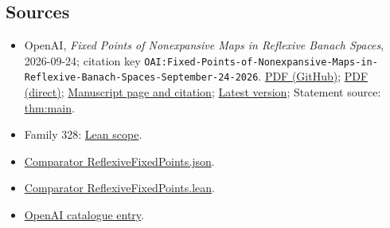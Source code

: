\documentclass[11pt]{article}
\begin{document}
\subsection{Sources}
\begin{itemize}
\item OpenAI, \emph{Fixed Points of Nonexpansive Maps in Reflexive Banach Spaces}, 2026-09-24; citation key \texttt{OAI:Fixed-Points-of-Nonexpansive-Maps-in-Reflexive-Banach-Spaces-September-24-2026}. \href{https://github.com/openai/math/blob/adc7f1241b42e322a6451854ab7e4b4c146bf78a/preprints/Fixed-Points-of-Nonexpansive-Maps-in-Reflexive-Banach-Spaces-September-24-2026/paper.pdf}{PDF (GitHub)}; \href{https://github.com/openai/math/raw/adc7f1241b42e322a6451854ab7e4b4c146bf78a/preprints/Fixed-Points-of-Nonexpansive-Maps-in-Reflexive-Banach-Spaces-September-24-2026/paper.pdf}{PDF (direct)}; \href{https://github.com/openai/math/blob/adc7f1241b42e322a6451854ab7e4b4c146bf78a/preprints/Fixed-Points-of-Nonexpansive-Maps-in-Reflexive-Banach-Spaces-September-24-2026/README.md}{Manuscript page and citation}; \href{https://github.com/openai/math/blob/main/preprints/Fixed-Points-of-Nonexpansive-Maps-in-Reflexive-Banach-Spaces-September-24-2026/paper.pdf}{Latest version}; Statement source: \href{https://github.com/openai/math/blob/adc7f1241b42e322a6451854ab7e4b4c146bf78a/preprints/Fixed-Points-of-Nonexpansive-Maps-in-Reflexive-Banach-Spaces-September-24-2026/build/sections/00-introduction.tex\#L9}{thm:main}.
\item Family 328: \href{https://github.com/openai/math/blob/adc7f1241b42e322a6451854ab7e4b4c146bf78a/lean/docs/328.md}{Lean scope}.
\item \href{https://github.com/openai/math/blob/adc7f1241b42e322a6451854ab7e4b4c146bf78a/lean/ComparatorChallenges/ReflexiveFixedPoints.json}{Comparator ReflexiveFixedPoints.json}.
\item \href{https://github.com/openai/math/blob/adc7f1241b42e322a6451854ab7e4b4c146bf78a/lean/ComparatorChallenges/ReflexiveFixedPoints.lean}{Comparator ReflexiveFixedPoints.lean}.
\item \href{https://github.com/openai/math/blob/adc7f1241b42e322a6451854ab7e4b4c146bf78a/CONTENTS.md}{OpenAI catalogue entry}.
\end{itemize}
\end{document}
